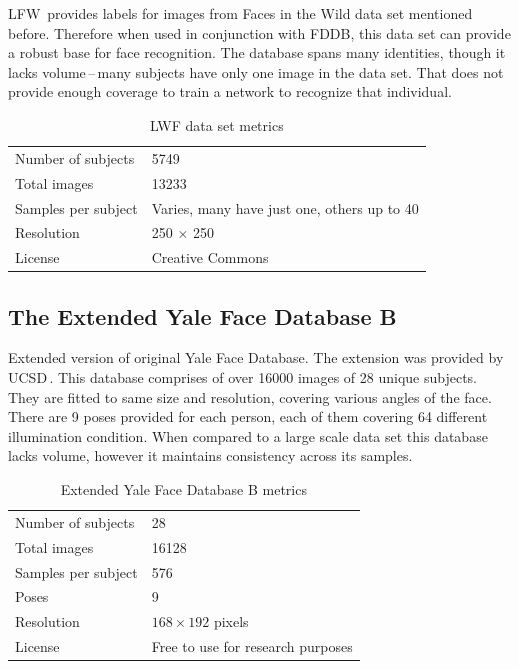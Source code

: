 LFW\,\cite{lfw} provides labels for images from Faces in the Wild data set mentioned before. Therefore when used in conjunction with FDDB, this data set can provide a robust base for face recognition. The database spans many identities, though it lacks volume\,--\,many subjects have only one image in the data set. That does not provide enough coverage to train a network to recognize that individual.

\begin{table}[ht]
    \centering
    \begin{tabularx}{.8\textwidth}{l|X}
        \toprule
        Number of subjects & \num{5749} \\
        Total images & \num{13233} \\
        Samples per subject & Varies, many have just one, others up to 40 \\
        Resolution & 250 $\times$ 250 \\
        License & Creative Commons \\
        \bottomrule
    \end{tabularx}
    \caption{LWF data set metrics}
\end{table}

\subsection{The Extended Yale Face Database B}

Extended version of original Yale Face Database. The extension was provided by UCSD\,\cite{ext_yale_paper}. This database comprises of over \num{16000} images of 28 unique subjects. They are fitted to same size and resolution, covering various angles of the face. There are 9 poses provided for each person, each of them covering 64 different illumination condition. When compared to a large scale data set this database lacks volume, however it maintains consistency across its samples.

\begin{table}[ht]
    \centering
    \begin{tabularx}{.8\textwidth}{l|X}
        \toprule
        Number of subjects & 28 \\
        Total images & \num{16128} \\
        Samples per subject & 576 \\
        Poses & 9 \\
        Resolution & $168 \times 192$ pixels \\
        License & Free to use for research purposes\\
        \bottomrule
    \end{tabularx}
    \caption{Extended Yale Face Database B metrics}
\end{table}

